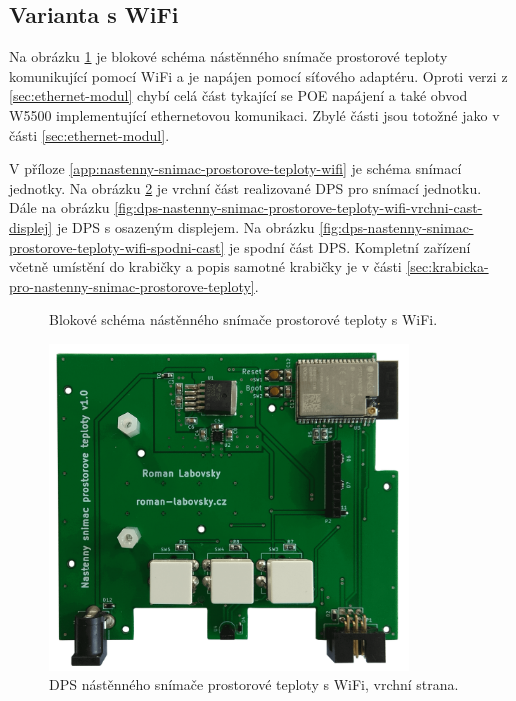 \subsection{Varianta s WiFi}
\label{sec:wifi-modul}

Na obrázku \ref{fig:blokove-schema-nastenny-snimac-teploty-wifi} je blokové schéma nástěnného snímače prostorové teploty komunikující pomocí WiFi a je napájen pomocí síťového adaptéru. Oproti verzi z \ref{sec:ethernet-modul} chybí celá část tykající se POE napájení a také obvod W5500 implementující ethernetovou komunikaci. Zbylé části jsou totožné jako v části \ref{sec:ethernet-modul}.

V příloze \ref{app:nastenny-snimac-prostorove-teploty-wifi} je schéma snímací jednotky. Na obrázku \ref{fig:dps-nastenny-snimac-prostorove-teploty-wifi-vrchni-cast} je vrchní část realizované DPS pro snímací jednotku. Dále na obrázku \ref{fig:dps-nastenny-snimac-prostorove-teploty-wifi-vrchni-cast-displej} je DPS s osazeným displejem. Na obrázku \ref{fig:dps-nastenny-snimac-prostorove-teploty-wifi-spodni-cast} je spodní část DPS. Kompletní zařízení včetně umístění do krabičky a popis samotné krabičky je v části \ref{sec:krabicka-pro-nastenny-snimac-prostorove-teploty}.

\begin{figure}[H]
    \centering
    \def\svgwidth{\columnwidth}
    
    \caption[]{Blokové schéma nástěnného snímače prostorové teploty s WiFi.}
    \label{fig:blokove-schema-nastenny-snimac-teploty-wifi}
\end{figure}

\begin{figure}[H]
    \centering
    \includegraphics[width=0.85\textwidth]{images/nastenny-snimac-prostorove-teploty-wifi/dps-nastenny-snimac-prostorove-teploty-wifi-vrchni-cast.png}
    \caption{DPS nástěnného snímače prostorové teploty s WiFi, vrchní strana.}
    \label{fig:dps-nastenny-snimac-prostorove-teploty-wifi-vrchni-cast}
\end{figure}

